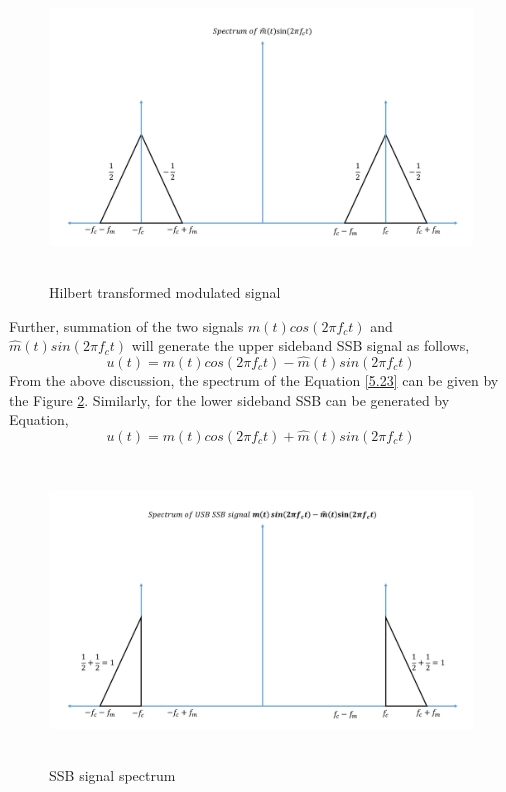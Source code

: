 \begin{figure}[h]
	\centering
	\includegraphics[width=1.0\textwidth, height=8cm]{./sdf/simplified_coherent_receiver/figures/SSB5.pdf}
	\caption{Hilbert transformed modulated signal}\label{Hilbert_Final}
\end{figure}

Further, summation of the two signals ${m(t)} cos(2\pi f_c t)$ and ${\hat{m}(t)} sin(2\pi f_c t)$ will generate the upper sideband SSB signal as follows,
\begin{equation}
u(t)={m(t)} cos(2\pi f_c t)-{\hat{m}(t)} sin(2\pi f_c t)
\label{5.23}
\end{equation}
From the above discussion, the spectrum of the Equation \ref{5.23} can be given by the Figure \ref{SSB_signal_spectrum}. Similarly, for the lower sideband SSB can be generated by Equation,
\begin{equation}
u(t)={m(t)} cos(2\pi f_c t)+{\hat{m}(t)} sin(2\pi f_c t)
\label{5.24}
\end{equation}
\begin{figure}[h]
	\centering
	\includegraphics[width=1.0\textwidth, height=8cm]{./sdf/simplified_coherent_receiver/figures/SSB6.pdf}
	\caption{SSB signal spectrum}\label{SSB_signal_spectrum}
\end{figure}



